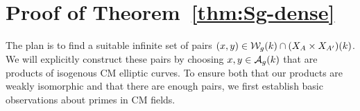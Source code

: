 \documentclass{amsart}
\begin{document}
%





\section{Proof of Theorem~\ref{thm:Sg-dense}}
\label{sec:step-2}


The plan is to find a suitable infinite set of pairs $(x,y) \in \mathcal{W}_g(k) \cap (X_A \times X_{A'})(k)$. We will explicitly construct these pairs by choosing $x,y \in \mathcal{A}_g(k)$ that are products of isogenous CM elliptic curves. To ensure both that our products are weakly isomorphic and that there are enough pairs, we first establish basic observations about primes in CM fields.

\end{document}
